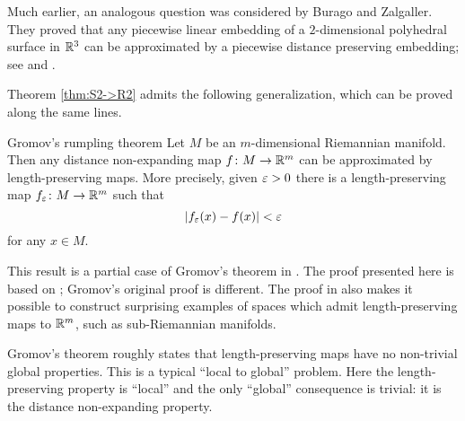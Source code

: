 Much earlier, an analogous question was considered by Burago and Zalgaller.
They proved that any piecewise linear embedding 
of a $2$-dimensional polyhedral surface in $\mathbb{R}^3$ 
can be approximated by a piecewise distance preserving embedding; see \cite{burago-zalgaller-0} and \cite{burago-zalgaller}. 


Theorem \ref{thm:S2->R2} 
admits the following generalization,
which can be proved along the same lines.

\begin{thm}{Gromov's rumpling theorem}
Let $M$ be an $m$-dimensional Riemannian manifold.
Then any distance non-expanding map $f\colon M\to \mathbb{R}^m$ 
can be approximated by length-preserving maps.
More precisely, given $\varepsilon>0$ there is a length-preserving map $f_\varepsilon\colon M\to\mathbb{R}^m$
such that 
$$|f_\varepsilon(x)-f(x)|<\varepsilon$$
for any $x\in M$.
\end{thm}

This result is a partial case of Gromov's theorem in \cite[Section~2.4.11]{gromov}.
The proof presented here is based on \cite{petrunin-inverse};
Gromov's original proof is different.
The proof in \cite{petrunin-inverse}
also makes it possible to construct surprising examples of spaces which admit length-preserving maps to $\mathbb{R}^m$, such as sub-Riemannian manifolds.

Gromov's theorem roughly states that length-preserving maps 
have no non-trivial global properties.
This is a typical ``local to global'' problem.
Here
the length-preserving property is ``local''
and the only ``global'' consequence is trivial:
it is the distance non-expanding property.


